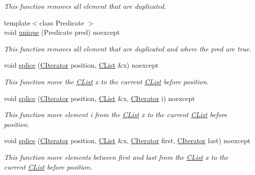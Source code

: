 \begin{DoxyCompactItemize}
\begin{DoxyCompactList}\small\item\em This function removes all element that are duplicated. \end{DoxyCompactList}\item 
{\footnotesize template$<$class Predicate $>$ }\\void \hyperlink{classnsSdD_1_1CList_acb314c9ce6c108b5c6481284681334f8}{unique} (Predicate pred) noexcept
\begin{DoxyCompactList}\small\item\em This function removes all element that are duplicated and where the {\ttfamily pred} are true. \end{DoxyCompactList}\item 
void \hyperlink{classnsSdD_1_1CList_a987252679b419150d62719f8dabb2ad4}{splice} (\hyperlink{structnsSdD_1_1CList_1_1CIterator}{C\+Iterator} position, \hyperlink{classnsSdD_1_1CList}{C\+List} \&x) noexcept
\begin{DoxyCompactList}\small\item\em This function move the \hyperlink{classnsSdD_1_1CList}{C\+List} {\ttfamily x} to the current \hyperlink{classnsSdD_1_1CList}{C\+List} before {\ttfamily position}. \end{DoxyCompactList}\item 
void \hyperlink{classnsSdD_1_1CList_a68315c715024cccae8905e92a1c58429}{splice} (\hyperlink{structnsSdD_1_1CList_1_1CIterator}{C\+Iterator} position, \hyperlink{classnsSdD_1_1CList}{C\+List} \&x, \hyperlink{structnsSdD_1_1CList_1_1CIterator}{C\+Iterator} i) noexcept
\begin{DoxyCompactList}\small\item\em This function move element {\ttfamily i} from the \hyperlink{classnsSdD_1_1CList}{C\+List} {\ttfamily x} to the current \hyperlink{classnsSdD_1_1CList}{C\+List} before {\ttfamily position}. \end{DoxyCompactList}\item 
void \hyperlink{classnsSdD_1_1CList_ac34a61185ef426909da583c61f1d3f32}{splice} (\hyperlink{structnsSdD_1_1CList_1_1CIterator}{C\+Iterator} position, \hyperlink{classnsSdD_1_1CList}{C\+List} \&x, \hyperlink{structnsSdD_1_1CList_1_1CIterator}{C\+Iterator} first, \hyperlink{structnsSdD_1_1CList_1_1CIterator}{C\+Iterator} last) noexcept
\begin{DoxyCompactList}\small\item\em This function move elements between {\ttfamily first} and {\ttfamily last} from the \hyperlink{classnsSdD_1_1CList}{C\+List} {\ttfamily x} to the current \hyperlink{classnsSdD_1_1CList}{C\+List} before {\ttfamily position}. \end{DoxyCompactList}\item 

\end{DoxyCompactItemize}

